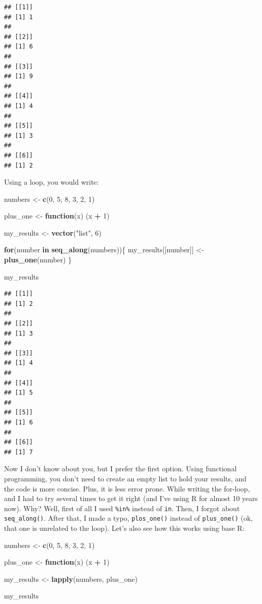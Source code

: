\documentclass[]{gitbook}
\newenvironment{Shaded}{\begin{snugshade}}{\end{snugshade}}
\newcommand{\ControlFlowTok}[1]{\textcolor[rgb]{0.13,0.29,0.53}{\textbf{#1}}}
\newcommand{\DecValTok}[1]{\textcolor[rgb]{0.00,0.00,0.81}{#1}}
\newcommand{\KeywordTok}[1]{\textcolor[rgb]{0.13,0.29,0.53}{\textbf{#1}}}
\newcommand{\NormalTok}[1]{#1}
\newcommand{\OperatorTok}[1]{\textcolor[rgb]{0.81,0.36,0.00}{\textbf{#1}}}
\newcommand{\StringTok}[1]{\textcolor[rgb]{0.31,0.60,0.02}{#1}}
\begin{document}
\begin{verbatim}
## [[1]]
## [1] 1
## 
## [[2]]
## [1] 6
## 
## [[3]]
## [1] 9
## 
## [[4]]
## [1] 4
## 
## [[5]]
## [1] 3
## 
## [[6]]
## [1] 2
\end{verbatim}

Using a loop, you would write:

\begin{Shaded}
\begin{Highlighting}[]
\NormalTok{numbers <-}\StringTok{ }\KeywordTok{c}\NormalTok{(}\DecValTok{0}\NormalTok{, }\DecValTok{5}\NormalTok{, }\DecValTok{8}\NormalTok{, }\DecValTok{3}\NormalTok{, }\DecValTok{2}\NormalTok{, }\DecValTok{1}\NormalTok{)}

\NormalTok{plus_one <-}\StringTok{ }\ControlFlowTok{function}\NormalTok{(x) (x }\OperatorTok{+}\StringTok{ }\DecValTok{1}\NormalTok{)}

\NormalTok{my_results <-}\StringTok{ }\KeywordTok{vector}\NormalTok{(}\StringTok{"list"}\NormalTok{, }\DecValTok{6}\NormalTok{)}

\ControlFlowTok{for}\NormalTok{(number }\ControlFlowTok{in} \KeywordTok{seq_along}\NormalTok{(numbers))\{}
\NormalTok{  my_results[[number]] <-}\StringTok{ }\KeywordTok{plus_one}\NormalTok{(number)}
\NormalTok{\}}

\NormalTok{my_results}
\end{Highlighting}
\end{Shaded}

\begin{verbatim}
## [[1]]
## [1] 2
## 
## [[2]]
## [1] 3
## 
## [[3]]
## [1] 4
## 
## [[4]]
## [1] 5
## 
## [[5]]
## [1] 6
## 
## [[6]]
## [1] 7
\end{verbatim}

Now I don't know about you, but I prefer the first option. Using functional programming, you don't
need to create an empty list to hold your results, and the code is more concise. Plus,
it is less error prone. While writing the for-loop, and I had to try several times to get it right
(and I've using R for almost 10 years now). Why? Well, first of all I used \texttt{\%in\%} instead of \texttt{in}.
Then, I forgot about \texttt{seq\_along()}. After that, I made a typo, \texttt{plos\_one()} instead of \texttt{plus\_one()}
(ok, that one is unrelated to the loop). Let's also see how this works using base R:

\begin{Shaded}
\begin{Highlighting}[]
\NormalTok{numbers <-}\StringTok{ }\KeywordTok{c}\NormalTok{(}\DecValTok{0}\NormalTok{, }\DecValTok{5}\NormalTok{, }\DecValTok{8}\NormalTok{, }\DecValTok{3}\NormalTok{, }\DecValTok{2}\NormalTok{, }\DecValTok{1}\NormalTok{)}

\NormalTok{plus_one <-}\StringTok{ }\ControlFlowTok{function}\NormalTok{(x) (x }\OperatorTok{+}\StringTok{ }\DecValTok{1}\NormalTok{)}

\NormalTok{my_results <-}\StringTok{ }\KeywordTok{lapply}\NormalTok{(numbers, plus_one)}

\NormalTok{my_results}
\end{Highlighting}
\end{Shaded}
\end{document}
